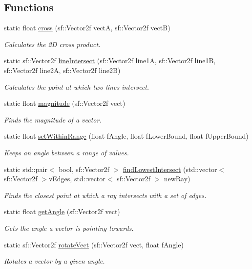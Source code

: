\subsection*{Functions}
\begin{DoxyCompactItemize}
\item 
static float \hyperlink{namespace_util_aa9cb7802e25081651b64f1f701f7541c}{cross} (sf\+::\+Vector2f vectA, sf\+::\+Vector2f vectB)
\begin{DoxyCompactList}\small\item\em Calculates the 2D cross product. \end{DoxyCompactList}\item 
static sf\+::\+Vector2f \hyperlink{namespace_util_a4f6d91cbe64be4e4297e5ae07a9fb64a}{line\+Intersect} (sf\+::\+Vector2f line1A, sf\+::\+Vector2f line1B, sf\+::\+Vector2f line2A, sf\+::\+Vector2f line2B)
\begin{DoxyCompactList}\small\item\em Calculates the point at which two lines intersect. \end{DoxyCompactList}\item 
static float \hyperlink{namespace_util_ad4f16b33bef1fb0de0b40a2d01e5ba3d}{magnitude} (sf\+::\+Vector2f vect)
\begin{DoxyCompactList}\small\item\em Finds the magnitude of a vector. \end{DoxyCompactList}\item 
static float \hyperlink{namespace_util_aefa994a894bb4bf287871a0ab756ac00}{set\+Within\+Range} (float f\+Angle, float f\+Lower\+Bound, float f\+Upper\+Bound)
\begin{DoxyCompactList}\small\item\em Keeps an angle between a range of values. \end{DoxyCompactList}\item 
static std\+::pair$<$ bool, sf\+::\+Vector2f $>$ \hyperlink{namespace_util_a0b6b9c5da48af75235e92300dbce08d0}{find\+Lowest\+Intersect} (std\+::vector$<$ sf\+::\+Vector2f $>$v\+Edges, std\+::vector$<$ sf\+::\+Vector2f $>$ new\+Ray)
\begin{DoxyCompactList}\small\item\em Finds the closest point at which a ray intersects with a set of edges. \end{DoxyCompactList}\item 
static float \hyperlink{namespace_util_a4388b22d564bbf04e68473256c2b3100}{get\+Angle} (sf\+::\+Vector2f vect)
\begin{DoxyCompactList}\small\item\em Gets the angle a vector is pointing towards. \end{DoxyCompactList}\item 
static sf\+::\+Vector2f \hyperlink{namespace_util_a73745a70851fbb031142c840ad84c48f}{rotate\+Vect} (sf\+::\+Vector2f vect, float f\+Angle)
\begin{DoxyCompactList}\small\item\em Rotates a vector by a given angle. \end{DoxyCompactList}\end{DoxyCompactItemize}


